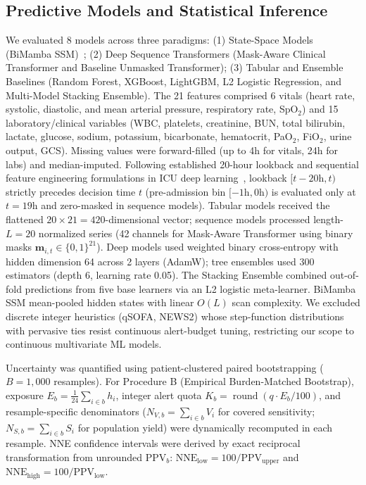 \documentclass[10pt,twocolumn,a4paper]{article}
\begin{document}
\subsection{Predictive Models and Statistical Inference}
We evaluated 8 models across three paradigms: (1) State-Space Models (BiMamba SSM)~\cite{gu2023mamba,gu2022efficiently}; (2) Deep Sequence Transformers (Mask-Aware Clinical Transformer and Baseline Unmasked Transformer); (3) Tabular and Ensemble Baselines (Random Forest, XGBoost, LightGBM, L2 Logistic Regression, and Multi-Model Stacking Ensemble). The 21 features comprised 6 vitals (heart rate, systolic, diastolic, and mean arterial pressure, respiratory rate, SpO$_2$) and 15 laboratory/clinical variables (WBC, platelets, creatinine, BUN, total bilirubin, lactate, glucose, sodium, potassium, bicarbonate, hematocrit, PaO$_2$, FiO$_2$, urine output, GCS). Missing values were forward-filled (up to 4h for vitals, 24h for labs) and median-imputed. Following established 20-hour lookback and sequential feature engineering formulations in ICU deep learning~\cite{shayan2025enhanced}, lookback $[t-20\text{h}, t)$ strictly precedes decision time $t$ (pre-admission bin $[-1\text{h}, 0\text{h})$ is evaluated only at $t=19\text{h}$ and zero-masked in sequence models). Tabular models received the flattened $20 \times 21 = 420$-dimensional vector; sequence models processed length-$L=20$ normalized series (42 channels for Mask-Aware Transformer using binary masks $\mathbf{m}_{i,t} \in \{0, 1\}^{21}$). Deep models used weighted binary cross-entropy with hidden dimension 64 across 2 layers (AdamW); tree ensembles used 300 estimators (depth 6, learning rate 0.05). The Stacking Ensemble combined out-of-fold predictions from five base learners via an L2 logistic meta-learner. BiMamba SSM mean-pooled hidden states with linear $O(L)$ scan complexity. We excluded discrete integer heuristics (qSOFA, NEWS2) whose step-function distributions with pervasive ties resist continuous alert-budget tuning, restricting our scope to continuous multivariate ML models.

Uncertainty was quantified using patient-clustered paired bootstrapping ($B=1,000$ resamples). For Procedure B (Empirical Burden-Matched Bootstrap), exposure $E_b = \frac{1}{24}\sum_{i\in b} h_i$, integer alert quota $K_b = \operatorname{round}(q \cdot E_b / 100)$, and resample-specific denominators ($N_{V,b} = \sum_{i \in b} V_i$ for covered sensitivity; $N_{S,b} = \sum_{i \in b} S_i$ for population yield) were dynamically recomputed in each resample. NNE confidence intervals were derived by exact reciprocal transformation from unrounded $\text{PPV}_b$: $\text{NNE}_{\text{low}} = 100 / \text{PPV}_{\text{upper}}$ and $\text{NNE}_{\text{high}} = 100 / \text{PPV}_{\text{low}}$.
\end{document}
